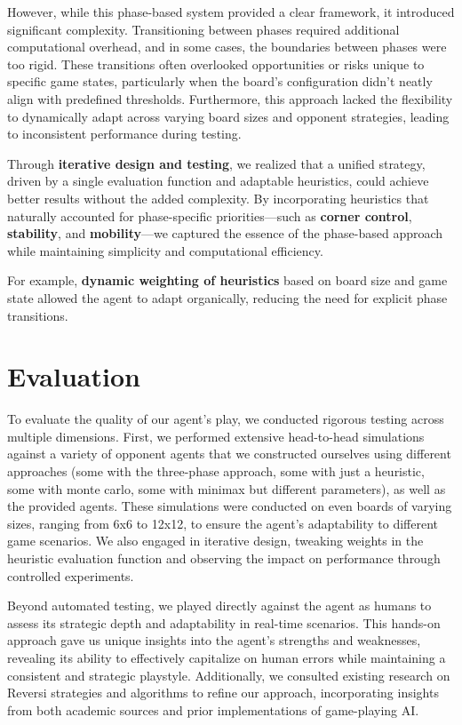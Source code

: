 \documentclass[11pt]{article}
\begin{document}
\noindent However, while this phase-based system provided a clear framework, it introduced significant complexity. Transitioning between phases required additional computational overhead, and in some cases, the boundaries between phases were too rigid. These transitions often overlooked opportunities or risks unique to specific game states, particularly when the board’s configuration didn't neatly align with predefined thresholds. Furthermore, this approach lacked the flexibility to dynamically adapt across varying board sizes and opponent strategies, leading to inconsistent performance during testing.

\noindent Through \textbf{iterative design and testing}, we realized that a unified strategy, driven by a single evaluation function and adaptable heuristics, could achieve better results without the added complexity. By incorporating heuristics that naturally accounted for phase-specific priorities—such as \textbf{corner control}, \textbf{stability}, and \textbf{mobility}—we captured the essence of the phase-based approach while maintaining simplicity and computational efficiency. 

\noindent For example, \textbf{dynamic weighting of heuristics} based on board size and game state allowed the agent to adapt organically, reducing the need for explicit phase transitions.



\section*{Evaluation}

To evaluate the quality of our agent's play, we conducted rigorous testing across multiple dimensions. First, we performed extensive head-to-head simulations against a variety of opponent agents that we constructed ourselves using different approaches (some with the three-phase approach, some with just a heuristic, some with monte carlo, some with minimax but different parameters), as well as the provided agents. These simulations were conducted on even boards of varying sizes, ranging from 6x6 to 12x12, to ensure the agent's adaptability to different game scenarios. We also engaged in iterative design, tweaking weights in the heuristic evaluation function and observing the impact on performance through controlled experiments.

Beyond automated testing, we played directly against the agent as humans to assess its strategic depth and adaptability in real-time scenarios. This hands-on approach gave us unique insights into the agent’s strengths and weaknesses, revealing its ability to effectively capitalize on human errors while maintaining a consistent and strategic playstyle. Additionally, we consulted existing research on Reversi strategies and algorithms to refine our approach, incorporating insights from both academic sources and prior implementations of game-playing AI.
\end{document}
